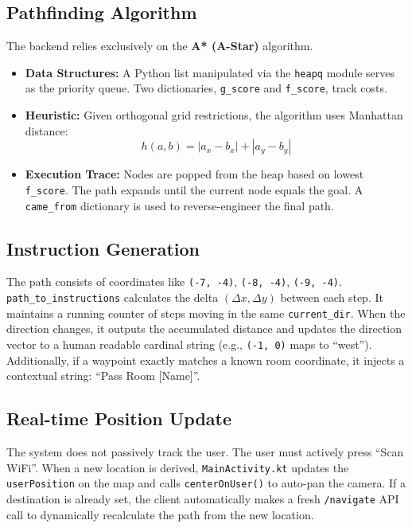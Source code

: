 \documentclass[11pt,a4paper]{article}
\begin{document}
\subsection{Pathfinding Algorithm}
The backend relies exclusively on the \textbf{A* (A-Star)} algorithm.
\begin{itemize}
\item \textbf{Data Structures:} A Python list manipulated via the \texttt{heapq} module serves as the priority queue. Two dictionaries, \texttt{g\_score} and \texttt{f\_score}, track costs.
\item \textbf{Heuristic:} Given orthogonal grid restrictions, the algorithm uses Manhattan distance:
\begin{equation}
h(a, b) = |a_x - b_x| + |a_y - b_y|
\end{equation}
\item \textbf{Execution Trace:} Nodes are popped from the heap based on lowest \texttt{f\_score}. The path expands until the current node equals the goal. A \texttt{came\_from} dictionary is used to reverse-engineer the final path.
\end{itemize}
\subsection{Instruction Generation}
The path consists of coordinates like \texttt{(-7, -4)}, \texttt{(-8, -4)}, \texttt{(-9, -4)}. \texttt{path\_to\_instructions} calculates the delta $(\Delta x, \Delta y)$ between each step. It maintains a running counter of steps moving in the same \texttt{current\_dir}. When the direction changes, it outputs the accumulated distance and updates the direction vector to a human readable cardinal string (e.g., \texttt{(-1, 0)} maps to ``west''). Additionally, if a waypoint exactly matches a known room coordinate, it injects a contextual string: ``Pass Room [Name]''.
\subsection{Real-time Position Update}
The system does not passively track the user. The user must actively press ``Scan WiFi''. When a new location is derived, \texttt{MainActivity.kt} updates the \texttt{userPosition} on the map and calls \texttt{centerOnUser()} to auto-pan the camera. If a destination is already set, the client automatically makes a fresh \texttt{/navigate} API call to dynamically recalculate the path from the new location.
\end{document}
